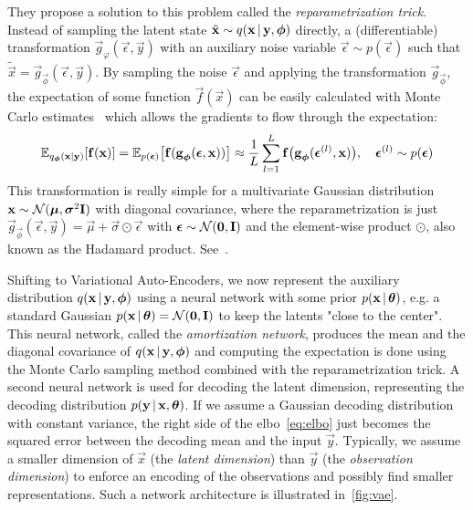 		They propose a solution to this problem called the \emph{reparametrization trick}. Instead of sampling the latent state \( \tilde{\boldsymbol{\mathrm{x}}} \sim q(\boldsymbol{\mathrm{x}} \,\vert\, \boldsymbol{\mathrm{y}}, \boldsymbol{\mathrm{\phi}}) \) directly, a (differentiable) transformation \( \vec{g}_{\varphi}(\vec{\epsilon}, \vec{y}) \) with an auxiliary noise variable \(\vec{\epsilon} \sim p(\vec{\epsilon})\) such that \( \tilde{\vec{x}} = \vec{g}_{\vec{\phi}}(\vec{\epsilon}, \vec{y}) \). By sampling the noise \(\vec{\epsilon}\) and applying the transformation \(\vec{g}_{\vec{\phi}}\), the expectation of some function \( \vec{f}(\vec{x}) \) can be easily calculated with Monte Carlo estimates~\cite{kingmaAutoEncodingVariationalBayes2014} which allows the gradients to flow through the expectation:
		\begin{align*}
			\mathbb{E}_{q_{\boldsymbol{\mathrm{\phi}}}(\boldsymbol{\mathrm{x}} \vert \boldsymbol{\mathrm{y}})} [\boldsymbol{\mathrm{f}}(\boldsymbol{\mathrm{x}})]
				= \mathbb{E}_{p(\boldsymbol{\mathrm{\epsilon}})}\big[ \boldsymbol{\mathrm{f}}(\boldsymbol{\mathrm{g}}_{\boldsymbol{\mathrm{\phi}}}(\boldsymbol{\mathrm{\epsilon}}, \boldsymbol{\mathrm{x}})) \big]
				\approx \frac{1}{L} \sum_{l = 1}^{L} \boldsymbol{\mathrm{f}}\big(\boldsymbol{\mathrm{g}}_{\boldsymbol{\mathrm{\phi}}}(\boldsymbol{\mathrm{\epsilon}}^{(l)}, \boldsymbol{\mathrm{x}})\big),\quad \boldsymbol{\mathrm{\epsilon}}^{(l)} \sim p(\boldsymbol{\mathrm{\epsilon}})
		\end{align*}
		This transformation is really simple for a multivariate Gaussian distribution \( \boldsymbol{\mathrm{x}} \sim \mathcal{N}(\boldsymbol{\mathrm{\mu}}, \boldsymbol{\mathrm{\sigma}}^2 \boldsymbol{\mathrm{I}}) \) with diagonal covariance, where the reparametrization is just \( \vec{g}_{\vec{\phi}}(\vec{\epsilon}, \vec{y}) = \vec{\mu} + \vec{\sigma} \odot \vec{\epsilon} \) with \( \boldsymbol{\mathrm{\epsilon}} \sim \mathcal{N}(\boldsymbol{\mathrm{0}}, \boldsymbol{\mathrm{I}}) \) and the element-wise product \( \odot \), also known as the Hadamard product. See~\cite[5]{kingmaAutoEncodingVariationalBayes2014}.

		Shifting to Variational Auto-Encoders, we now represent the auxiliary distribution \( q(\boldsymbol{\mathrm{x}} \,\vert\, \boldsymbol{\mathrm{y}}, \boldsymbol{\mathrm{\phi}}) \) using a neural network with some prior \( p(\boldsymbol{\mathrm{x}} \,\vert\, \boldsymbol{\mathrm{\theta}}) \), e.g. a standard Gaussian \( p(\boldsymbol{\mathrm{x}} \,\vert\, \boldsymbol{\mathrm{\theta}}) = \mathcal{N}(\boldsymbol{\mathrm{0}}, \boldsymbol{\mathrm{I}}) \) to keep the latents "close to the center". This neural network, called the \emph{amortization network}, produces the mean and the diagonal covariance of \( q(\boldsymbol{\mathrm{x}} \,\vert\, \boldsymbol{\mathrm{y}}, \boldsymbol{\mathrm{\phi}}) \) and computing the expectation is done using the Monte Carlo sampling method combined with the reparametrization trick. A second neural network is used for decoding the latent dimension, representing the decoding distribution \( p(\boldsymbol{\mathrm{y}} \,\vert\, \boldsymbol{\mathrm{x}}, \boldsymbol{\mathrm{\theta}}) \). If we assume a Gaussian decoding distribution with constant variance, the right side of the \ac{elbo}~\eqref{eq:elbo} just becomes the squared error between the decoding mean and the input \(\vec{y}\). Typically, we assume a smaller dimension of \(\vec{x}\) (the \emph{latent dimension}) than \( \vec{y} \) (the \emph{observation dimension}) to enforce an encoding of the observations and possibly find smaller representations. Such a network architecture is illustrated in~\autoref{fig:vae}.

